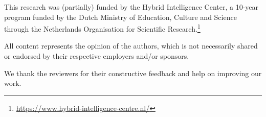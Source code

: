 \documentclass{article}
\begin{document}
\begin{ack}
  This research was (partially) funded by the Hybrid Intelligence Center, a 10-year program funded by the Dutch Ministry of Education, Culture and Science through the Netherlands Organisation for Scientific Research.\footnote{\url{https://www.hybrid-intelligence-centre.nl/}}

  All content represents the opinion of the authors, which is not necessarily shared or endorsed by their respective employers and/or sponsors.
  
  We thank the reviewers for their constructive feedback and help on improving our work. 

\end{ack}

 

\end{document}
